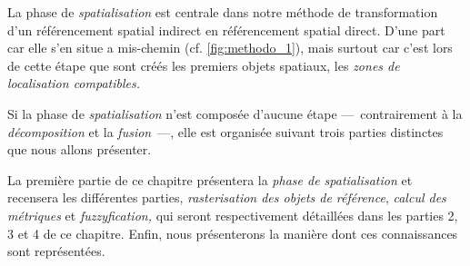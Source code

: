 

La phase de \emph{spatialisation} est centrale dans notre méthode de transformation d'un référencement spatial indirect en référencement spatial direct. D'une part car elle s'en situe a mis-chemin (cf. \autoref{fig:methodo_1}), mais surtout car c'est lors de cette étape que sont créés les premiers objets spatiaux, les \emph{zones de localisation compatibles.} 

Si la phase de \emph{spatialisation} n'est composée d'aucune étape ---~contrairement à la \emph{décomposition} et la \emph{fusion}~---, elle est organisée suivant trois parties distinctes que nous allons présenter.

La première partie de ce chapitre présentera la \emph{phase de spatialisation} et recensera les différentes parties, \emph{rasterisation des objets de référence}, \emph{calcul des métriques} et \emph{fuzzyfication,} qui seront respectivement détaillées dans les parties 2, 3 et 4 de ce chapitre. Enfin, nous présenterons la manière dont ces connaissances sont représentées.

